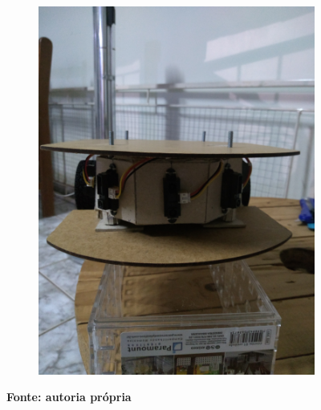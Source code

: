 \begin{figure}[!ht]
\begin{subfigure}[b]{0.49\textwidth}
		\includegraphics[trim={0cm 12.5cm 0cm 22.5cm}, clip, 
		scale=0.055]{Figuras/RoboMontagem6}
	\end{subfigure}
	\textbf{Fonte: autoria própria}
\end{figure}
